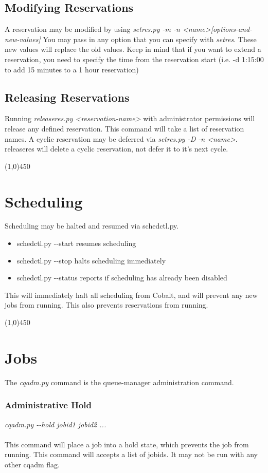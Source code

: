 \documentclass[10pt,letterpaper]{article}
\begin{document}
\subsection*{Modifying Reservations}
A reservation may be modified by using \textit{setres.py -m -n \textless name\textgreater [options-and-new-values]}
You may pass in any option that you can specify with \textit{setres}.  These new values will replace the old values.  Keep in mind that if you want to extend a reservation, you need to specify the time from the reservation start (i.e. -d 1:15:00 to add 15 minutes to a 1 hour reservation)
\subsection*{Releasing Reservations}
Running \textit{releaseres.py \textless reservation-name\textgreater} with administrator permissions will release any defined reservation.  This command will take a list of reservation names.  A cyclic reservation may be deferred via \textit{setres.py -D -n \textless name\textgreater}.  releaseres will delete a cyclic reservation, not defer it to it's next cycle.
\begin{center}
\line(1,0){450}
\end{center}
\section*{Scheduling}
Scheduling may be halted and resumed via schedctl.py.
\begin{itemize}
\item schedctl.py -\--start resumes scheduling
\item schedctl.py -\--stop halts scheduling immediately
\item schedctl.py -\--status reports if scheduling has already been disabled 
\end{itemize}
This will immediately halt all scheduling from Cobalt, and will prevent any new jobs from running.  This also prevents reservations from running.
\begin{center}
\line(1,0){450}
\end{center}
\section*{Jobs}
The \textit{cqadm.py} command is the queue-manager administration command.
\subsubsection*{Administrative Hold}
\textit{cqadm.py -\--hold jobid1 jobid2 ...}
\\
\\
This command will place a job into a hold state, which prevents the job from running.  This command will accepts a list of jobids. It may not be run with any other cqadm flag.
\end{document}
